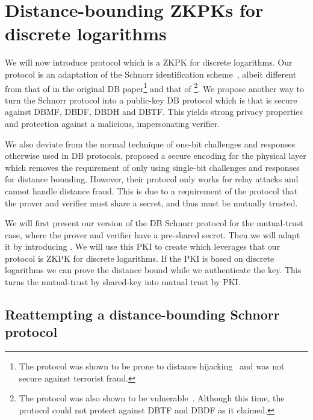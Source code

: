 \section{Distance-bounding \aclp*{ZKPK} for discrete logarithms}%
\label{DB-Schnorr-UWB}

We will now introduce  protocol which is a \ac{ZKPK} for discrete 
logarithms.
Our protocol is an adaptation of the Schnorr identification 
scheme~\cite{Schnorr}, albeit different from that of 
\textcite{DistanceBounding} in the original \ac{DB} paper\footnote{%
  The \citeauthor{DistanceBounding} protocol was shown to be prone to distance 
  hijacking~\cite{DistanceHijacking,TamarinDB} and was not secure against 
  terrorist fraud.
} and that of \textcite{Bussard-Bagga}\footnote{%
  The \citeauthor{Bussard-Bagga} protocol was also shown to be 
  vulnerable~\cite{Bussard-Bagga-attack}.
  Although this time, the protocol could not protect against \ac{DBTF} and 
  \ac{DBDF} as it claimed.
}.
We propose another way to turn the Schnorr protocol into a public-key \ac{DB} 
protocol which is  that is secure against \ac{DBMF}, \ac{DBDF}, 
\ac{DBDH} and \ac{DBTF}.
This yields strong privacy properties and protection against a malicious, 
impersonating verifier.

We also deviate from the normal technique of one-bit challenges and responses 
otherwise used in \ac{DB} protocols.
\Textcite{UWBPR} proposed a secure encoding for the physical 
layer which removes the requirement of only using single-bit challenges and 
responses for distance bounding.
However, their protocol only works for relay attacks and cannot handle distance 
fraud.
This is due to a requirement of the protocol that the prover and verifier must 
share a secret, and thus must be mutually trusted.

We will first present our version of the \ac{DB} Schnorr protocol for the 
mutual-trust case, where the prover and verifier have a pre-shared secret.
Then we will adapt it by introducing .
We will use this \ac{PKI} to create  which leverages that our protocol 
is  \ac{ZKPK} for discrete logarithms.
If the \ac{PKI} is based on discrete logarithms we can prove the distance bound 
while we authenticate the key.
This turns the mutual-trust by shared-key into mutual trust by 
\ac{PKI}.


\subsection{Reattempting a distance-bounding Schnorr protocol}%
\label{DB-Schnorr}

